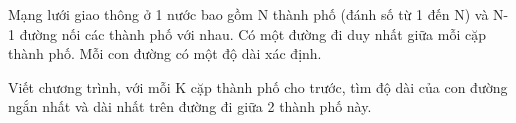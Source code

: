 Mạng lưới giao thông ở 1 nước bao gồm N thành phố (đánh số từ 1 đến N) và N-1 đường nối các thành phố với nhau. Có một đường đi duy nhất giữa mỗi cặp thành phố. Mỗi con đường có một độ dài xác định.  

   Viết chương trình, với mỗi K cặp thành phố cho trước, tìm độ dài của con đường ngắn nhất và dài nhất trên đường đi giữa 2 thành phố này.  

\